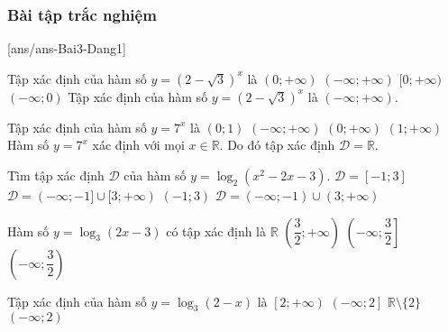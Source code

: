 \subsubsection{Bài tập trắc nghiệm}
[ans/ans-Bai3-Dang1]
\begin{ex}
	Tập xác định của hàm số $y=\left(2-\sqrt{3}\right)^x$ là
	\choice
	{$(0;+\infty)$}
	{\True $(-\infty;+\infty)$}
	{$[0;+\infty)$}
	{$(-\infty;0)$}
	\loigiai
	{
		Tập xác định của hàm số $y=\left(2-\sqrt{3}\right)^x$ là $(-\infty;+\infty)$.
	}
\end{ex}


\begin{ex}
	Tập xác định của hàm số $y=7^x$ là
	\choice
	{$(0;1)$}
	{\True $(-\infty;+\infty)$}
	{$(0;+\infty)$}
	{$(1;+\infty)$}
	\loigiai
	{
		Hàm số $y=7^x$ xác định với mọi $x\in \mathbb{R}$. Do đó tập xác định $\mathscr{D}=\mathbb{R}$.
	}
\end{ex}



\begin{ex}
	Tìm tập xác định $\mathscr{D}$ của hàm số $y=\log_2\left(x^2-2x-3 \right) $.
	\choice
	{$\mathscr{D}=[-1;3]$}
	{$\mathscr{D}=(-\infty;-1]\cup [3;+\infty)$}
	{$(-1;3)$}
	{\True $\mathscr{D}=(-\infty;-1)\cup (3;+\infty)$}
\end{ex}

\begin{ex}
	Hàm số $y=\log_3(2x-3)$ có tập xác định là
	\choice 
	{$\mathbb{R}$}
	{\True $\left(\dfrac{3}{2};+\infty \right) $}
	{$\left(-\infty;\dfrac{3}{2} \right] $}
	{$\left(-\infty;\dfrac{3}{2} \right) $}
\end{ex}


\begin{ex}
	Tập xác định của hàm số $y=\log_3(2-x)$ là
	\choice
	{$\left[2;+\infty\right)$}
	{$\left(-\infty;2\right] $}
	{$\mathbb{R}\setminus\{2\}$}
	{\True $\left(-\infty;2\right)$}
\end{ex}

